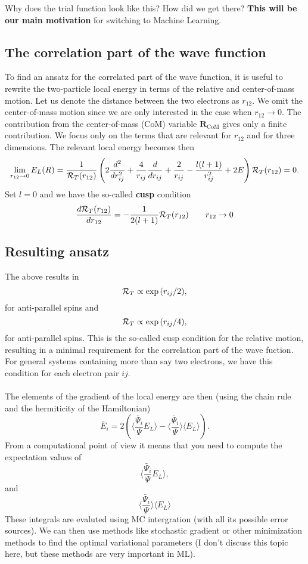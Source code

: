 \documentclass[aip,jcp,reprint,floatfix]{revtex4-1}
\begin{document}
\begin{itemize}
Why does the trial function look like this? How did we get there? \textbf{This will be our main motivation} for switching to
Machine Learning.



\subsection*{The correlation part of the wave function}

To find an ansatz for the correlated part of the wave function, it is useful to rewrite the two-particle
local energy in terms of the relative and center-of-mass motion.
Let us denote the distance between the two electrons as
$r_{12}$. We omit the center-of-mass motion since we are only interested in the case when
$r_{12} \rightarrow 0$. The contribution from the center-of-mass (CoM) variable $\bm{R}_{\mathrm{CoM}}$
gives only a finite contribution.
We focus only on the terms that are relevant for $r_{12}$ and for three dimensions. The relevant local energy becomes then
\[
\lim_{r_{12} \rightarrow 0}E_L(R)=
    \frac{1}{{\cal R}_T(r_{12})}\left(2\frac{d^2}{dr_{ij}^2}+\frac{4}{r_{ij}}\frac{d}{dr_{ij}}+
\frac{2}{r_{ij}}-\frac{l(l+1)}{r_{ij}^2}+2E
\right){\cal R}_T(r_{12}) = 0.
\]
Set $l=0$ and we have the so-called \textbf{cusp} condition
\[
\frac{d {\cal R}_T(r_{12})}{dr_{12}} = -\frac{1}{2(l+1)}
{\cal R}_T(r_{12})\qquad r_{12}\to 0
\]

\subsection*{Resulting ansatz}
The above  results in
\[
{\cal R}_T  \propto \exp{(r_{ij}/2)}, 
\]
for anti-parallel spins and 
\[
{\cal R}_T  \propto \exp{(r_{ij}/4)}, 
\]
for anti-parallel spins. 
This is the so-called cusp condition for the relative motion, resulting in a minimal requirement
for the correlation part of the wave fuction.
For general systems containing more than say two electrons, we have this
condition for each electron pair $ij$.






\paragraph{}
The elements of the gradient of the local energy are then (using the chain rule and the hermiticity of the Hamiltonian)
\[
\bar{E}_{i}= 2\left( \langle \frac{\bar{\Psi}_{i}}{\Psi}E_L\rangle -\langle \frac{\bar{\Psi}_{i}}{\Psi}\rangle\langle E_L \rangle\right).
\]
From a computational point of view it means that you need to compute the expectation values of 
\[
\langle \frac{\bar{\Psi}_{i}}{\Psi}E_L\rangle,
\]
and
\[
\langle \frac{\bar{\Psi}_{i}}{\Psi}\rangle\langle E_L\rangle
\]
These integrals are evaluted using MC intergration (with all its possible error sources). 
We can then use methods like stochastic gradient or other minimization methods to find the optimal variational parameters (I don't discuss this topic here, but these methods are very important in ML).




\end{itemize}
\end{document}
